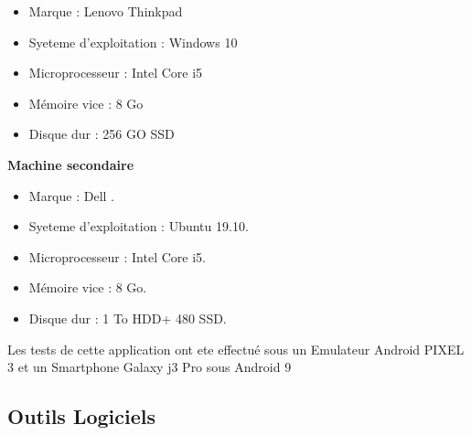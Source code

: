 \begin{itemize}
    \item Marque : Lenovo Thinkpad
    \item Syeteme d'exploitation : Windows 10
    \item Microprocesseur : Intel Core i5
    \item Mémoire vice : 8 Go
    \item Disque dur : 256 GO SSD
          
\end{itemize}
\textbf{Machine secondaire}
\begin{itemize}
    \item Marque : Dell .
    \item Syeteme d'exploitation : Ubuntu 19.10.
    \item Microprocesseur : Intel Core i5.
    \item Mémoire vice : 8 Go.
    \item Disque dur : 1 To HDD+ 480 SSD.
\end{itemize}
Les tests de cette application  ont ete effectué sous un Emulateur Android PIXEL 3 et un Smartphone Galaxy j3 Pro sous Android 9
\newpage
\subsection{Outils Logiciels}
